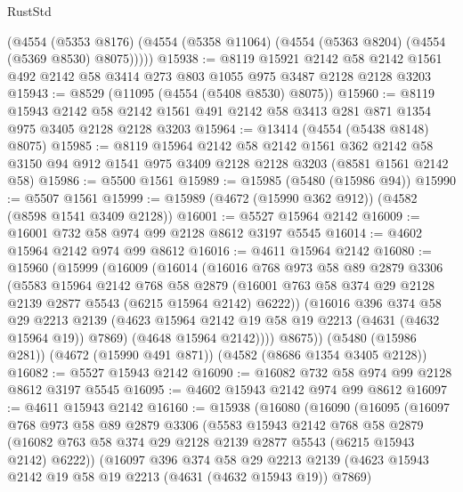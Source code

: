 \begin{lexlean}{RustStd}
\begin{coremodule}
      (@4554
        (@5353 @8176)
        (@4554 (@5358 @11064) (@4554 (@5363 @8204) (@4554 (@5369 @8530) @8075)))))
@15938 := @8119
    @15921
    @2142
    @58
    @2142
    @1561
    @492
    @2142
    @58
    @3414
    @273
    @803
    @1055
    @975
    @3487
    @2128
    @2128
    @3203
@15943 := @8529 (@11095 (@4554 (@5408 @8530) @8075))
@15960 := @8119
    @15943
    @2142
    @58
    @2142
    @1561
    @491
    @2142
    @58
    @3413
    @281
    @871
    @1354
    @975
    @3405
    @2128
    @2128
    @3203
@15964 := @13414 (@4554 (@5438 @8148) @8075)
@15985 := @8119
    @15964
    @2142
    @58
    @2142
    @1561
    @362
    @2142
    @58
    @3150
    @94
    @912
    @1541
    @975
    @3409
    @2128
    @2128
    @3203
    (@8581 @1561 @2142 @58)
@15986 := @5500 @1561
@15989 := @15985 (@5480 (@15986 @94))
@15990 := @5507 @1561
@15999 := @15989 (@4672 (@15990 @362 @912)) (@4582 (@8598 @1541 @3409 @2128))
@16001 := @5527 @15964 @2142
@16009 := @16001 @732 @58 @974 @99 @2128 @8612 @3197 @5545
@16014 := @4602 @15964 @2142 @974 @99 @8612
@16016 := @4611 @15964 @2142
@16080 := @15960
    (@15999
      (@16009
        (@16014
          (@16016
            @768
            @973
            @58
            @89
            @2879
            @3306
            (@5583
              @15964
              @2142
              @768
              @58
              @2879
              (@16001 @763 @58 @374 @29 @2128 @2139 @2877 @5543 (@6215 @15964 @2142) @6222))
            (@16016
              @396
              @374
              @58
              @29
              @2213
              @2139
              (@4623 @15964 @2142 @19 @58 @19 @2213 (@4631 (@4632 @15964 @19)) @7869)
              (@4648 @15964 @2142))))
        @8675))
    (@5480 (@15986 @281))
    (@4672 (@15990 @491 @871))
    (@4582 (@8686 @1354 @3405 @2128))
@16082 := @5527 @15943 @2142
@16090 := @16082 @732 @58 @974 @99 @2128 @8612 @3197 @5545
@16095 := @4602 @15943 @2142 @974 @99 @8612
@16097 := @4611 @15943 @2142
@16160 := @15938
    (@16080
      (@16090
        (@16095
          (@16097
            @768
            @973
            @58
            @89
            @2879
            @3306
            (@5583
              @15943
              @2142
              @768
              @58
              @2879
              (@16082 @763 @58 @374 @29 @2128 @2139 @2877 @5543 (@6215 @15943 @2142) @6222))
            (@16097
              @396
              @374
              @58
              @29
              @2213
              @2139
              (@4623 @15943 @2142 @19 @58 @19 @2213 (@4631 (@4632 @15943 @19)) @7869)

\end{coremodule}
\end{lexlean}
